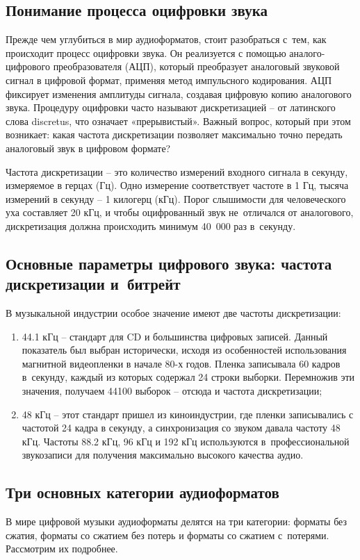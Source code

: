 \documentclass{ou}
\begin{document}
\subsection{Понимание процесса оцифровки звука}
Прежде чем углубиться в мир аудиоформатов, стоит разобраться с~тем, как происходит процесс оцифровки звука. Он реализуется с помощью аналого-цифрового преобразователя (АЦП), который преобразует аналоговый звуковой сигнал в цифровой формат, применяя метод импульсного кодирования. АЦП фиксирует изменения амплитуды сигнала, создавая цифровую копию аналогового звука. Процедуру оцифровки часто называют дискретизацией -- от латинского слова discretus, что означает «прерывистый». Важный вопрос, который при этом возникает: какая частота дискретизации позволяет максимально точно передать аналоговый звук в цифровом формате?

Частота дискретизации -- это количество измерений входного сигнала в секунду, измеряемое в герцах (Гц). Одно измерение соответствует частоте в 1 Гц, тысяча измерений в секунду -- 1 килогерц (кГц). Порог слышимости для человеческого уха составляет 20 кГц, и чтобы оцифрованный звук не~отличался от аналогового, дискретизация должна происходить минимум 40~000 раз в~секунду.
\subsection{Основные параметры цифрового звука: частота дискретизации и~битрейт}
В музыкальной индустрии особое значение имеют две частоты дискретизации:
\begin{enumerate}[leftmargin=0em, itemindent=3.75em, nosep, label=\arabic*)]
\item 44.1 кГц -- стандарт для CD и большинства цифровых записей. Данный показатель был выбран исторически, исходя из особенностей использования магнитной видеопленки в начале 80-х годов. Пленка записывала 60 кадров в~секунду, каждый из которых содержал 24 строки выборки. Перемножив эти значения, получаем 44100 выборок -- отсюда и частота дискретизации;
\item 48 кГц -- этот стандарт пришел из киноиндустрии, где пленки записывались с частотой 24 кадра в секунду, а синхронизация со звуком давала частоту 48 кГц. Частоты 88.2 кГц, 96 кГц и 192 кГц используются в~профессиональной звукозаписи для получения максимально высокого качества аудио.
\end{enumerate}
\subsection{Три основных категории аудиоформатов}
В мире цифровой музыки аудиоформаты делятся на три категории: форматы без сжатия, форматы со сжатием без потерь и форматы со сжатием с~потерями. Рассмотрим их подробнее.
\end{document}
